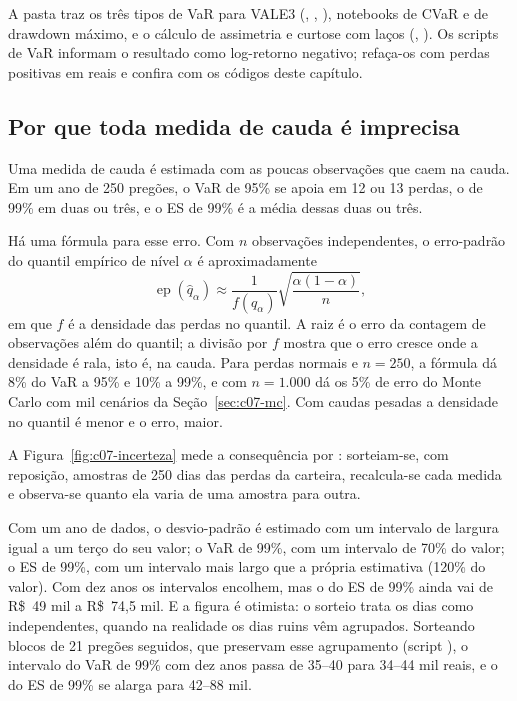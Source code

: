 \begin{repositorio}
A pasta  traz os três tipos de VaR para VALE3 (, , ), notebooks de CVaR e de drawdown máximo, e o cálculo de assimetria e curtose com laços (, ). Os scripts de VaR informam o resultado como log-retorno negativo; refaça-os com perdas positivas em reais e confira com os códigos deste capítulo.
\end{repositorio}

\subsection{Por que toda medida de cauda é imprecisa}

Uma medida de cauda é estimada com as poucas observações que caem na cauda. Em um ano de 250 pregões, o VaR de 95\% se apoia em 12 ou 13 perdas, o de 99\% em duas ou três, e o ES de 99\% é a média dessas duas ou três.

Há uma fórmula para esse erro. Com $n$ observações independentes, o erro-padrão do quantil empírico de nível $\alpha$ é aproximadamente
\begin{equation}
  \operatorname{ep}(\hat q_\alpha) \approx \frac{1}{f(q_\alpha)}\sqrt{\frac{\alpha(1-\alpha)}{n}} ,
  \label{eq:c07-ep-quantil}
\end{equation}
em que $f$ é a densidade das perdas no quantil. A raiz é o erro da contagem de observações além do quantil; a divisão por $f$ mostra que o erro cresce onde a densidade é rala, isto é, na cauda. Para perdas normais e $n = 250$, a fórmula dá 8\% do VaR a 95\% e 10\% a 99\%, e com $n = 1.000$ dá os 5\% de erro do Monte Carlo com mil cenários da Seção~\ref{sec:c07-mc}. Com caudas pesadas a densidade no quantil é menor e o erro, maior.

A Figura~\ref{fig:c07-incerteza} mede a consequência por : sorteiam-se, com reposição, amostras de 250 dias das perdas da carteira, recalcula-se cada medida e observa-se quanto ela varia de uma amostra para outra.


Com um ano de dados, o desvio-padrão é estimado com um intervalo de largura igual a um terço do seu valor; o VaR de 99\%, com um intervalo de 70\% do valor; o ES de 99\%, com um intervalo mais largo que a própria estimativa (120\% do valor). Com dez anos os intervalos encolhem, mas o do ES de 99\% ainda vai de R\$~49 mil a R\$~74,5 mil. E a figura é otimista: o sorteio trata os dias como independentes, quando na realidade os dias ruins vêm agrupados. Sorteando blocos de 21 pregões seguidos, que preservam esse agrupamento (script ), o intervalo do VaR de 99\% com dez anos passa de 35--40 para 34--44 mil reais, e o do ES de 99\% se alarga para 42--88 mil.

